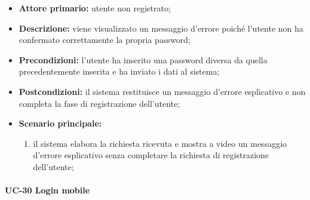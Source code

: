 	\begin{itemize}
		\item \textbf{Attore primario:} utente non registrato;

		\item \textbf{Descrizione:} viene visualizzato un messaggio d'errore poiché l'utente non ha confermato correttamente la propria password;

		\item \textbf{Precondizioni:} l'utente ha inserito una password diversa da quella precedentemente inserita e ha inviato i dati al sistema;

		\item \textbf{Postcondizioni:} il sistema restituisce un messaggio d'errore esplicativo e non completa la fase di registrazione dell'utente;

		\item \textbf{Scenario principale:}
	  		\begin{enumerate}
		  		\item il sistema elabora la richiesta ricevuta e mostra a video un messaggio d'errore esplicativo senza completare la richiesta di registrazione dell'utente; 
	  		\end{enumerate}
	\end{itemize}

    
\paragraph{UC-30 Login mobile}

